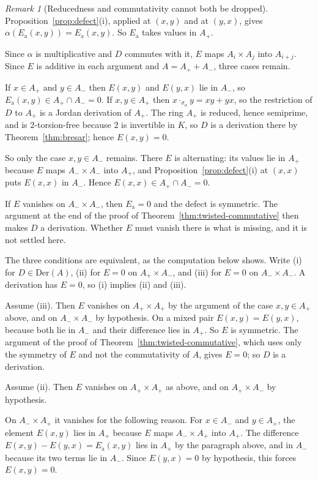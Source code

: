 \documentclass[]{interact}
\theoremstyle{plain}
\theoremstyle{definition}
\theoremstyle{remark}
\newtheorem{remark}[theorem]{Remark}
\newcommand{\Der}{\mathrm{Der}}
\begin{document}
\begin{remark}[Reducedness and commutativity cannot both be dropped]
Proposition~\ref{prop:defect}(i), applied at $(x,y)$ and at $(y,x)$, gives $\alpha(E_{\mathrm{a}}(x,y)) = E_{\mathrm{a}}(x,y)$.
So $E_{\mathrm{a}}$ takes values in $A_+$.

Since $\alpha$ is multiplicative and $D$ commutes with it, $E$ maps $A_i \times A_j$ into $A_{i+j}$.
Since $E$ is additive in each argument and $A = A_+ + A_-$, three cases remain.

If $x \in A_+$ and $y \in A_-$ then $E(x,y)$ and $E(y,x)$ lie in $A_-$, so $E_{\mathrm{a}}(x,y) \in A_+ \cap A_- = 0$.
If $x, y \in A_+$ then $x \cdot_{\sigma_\alpha} y = xy + yx$, so the restriction of $D$ to $A_+$ is a Jordan derivation of $A_+$. The ring $A_+$ is reduced, hence semiprime, and is $2$-torsion-free because $2$ is invertible in $K$, so $D$ is a derivation there by Theorem~\ref{thm:bresar}; hence $E(x,y) = 0$.

So only the case $x, y \in A_-$ remains.
There $E$ is alternating: its values lie in $A_+$ because $E$ maps $A_- \times A_-$ into $A_+$, and Proposition~\ref{prop:defect}(i) at $(x,x)$ puts $E(x,x)$ in $A_-$.
Hence $E(x,x) \in A_+ \cap A_- = 0$.

If $E$ vanishes on $A_- \times A_-$, then $E_{\mathrm{a}} = 0$ and the defect is symmetric. %
The argument at the end of the proof of Theorem~\ref{thm:twisted-commutative} then makes $D$ a derivation.
Whether $E$ must vanish there is what is missing, and it is not settled here.

The three conditions are equivalent, as the computation below shows. %
Write (i) for $D \in \Der(A)$, (ii) for $E = 0$ on $A_+ \times A_-$, and (iii) for $E = 0$ on $A_- \times A_-$.
A derivation has $E = 0$, so (i) implies (ii) and (iii).

Assume (iii).
Then $E$ vanishes on $A_+ \times A_+$ by the argument of the case $x, y \in A_+$ above, and on $A_- \times A_-$ by hypothesis. On a mixed pair $E(x,y) = E(y,x)$, because both lie in $A_-$ and their difference lies in $A_+$.
So $E$ is symmetric. The argument of the proof of Theorem~\ref{thm:twisted-commutative}, which uses only the symmetry of $E$ and not the commutativity of $A$, gives $E = 0$; so $D$ is a derivation.

Assume (ii).
Then $E$ vanishes on $A_+ \times A_+$ as above, and on $A_+ \times A_-$ by hypothesis.

On $A_- \times A_+$ it vanishes for the following reason.
For $x \in A_-$ and $y \in A_+$, the element $E(x,y)$ lies in $A_+$ because $E$ maps $A_- \times A_+$ into $A_+$.
The difference $E(x,y) - E(y,x) = E_{\mathrm{a}}(x,y)$ lies in $A_+$ by the paragraph above, and in $A_-$ because its two terms lie in $A_-$.
Since $E(y,x) = 0$ by hypothesis, this forces $E(x,y) = 0$.


\end{remark}
\end{document}
